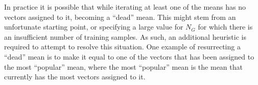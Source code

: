 In practice it is possible that while iterating at least one of the means has no vectors assigned to it,
becoming a ``dead'' mean.
This might stem from an unfortunate starting point, 
or specifying a large value for $N_G$ for which there is an insufficient number of training samples.
As such, an additional heuristic is required to attempt to resolve this situation.
One example of resurrecting a ``dead'' mean is to make it equal to one of the vectors
that has been assigned to the most ``popular'' mean,
where the most ``popular'' mean is the mean that currently has the most vectors assigned to it.



% 
